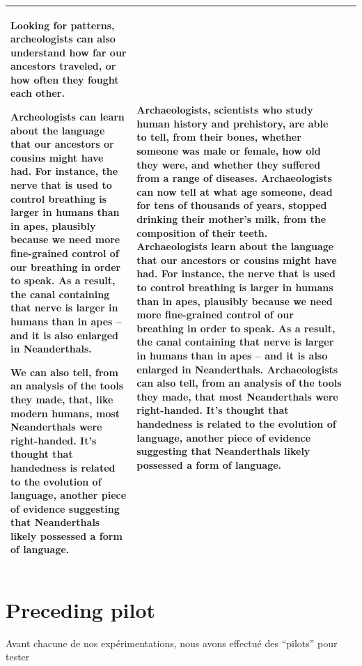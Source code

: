 \documentclass[
  doc,floatsintext]{apa6}
\begin{document}
\begin{longtable}[t]{>{\raggedright\arraybackslash}p{5em}>{\raggedright\arraybackslash}p{20em}>{\raggedright\arraybackslash}p{20em}}
Looking for patterns, archeologists can also understand how far our ancestors traveled, or how often they fought each other.

Archeologists can learn about the language that our ancestors or cousins might have had. For instance, the nerve that is used to control breathing is larger in humans than in apes, plausibly because we need more fine-grained control of our breathing in order to speak. As a result, the canal containing that nerve is larger in humans than in apes – and it is also enlarged in Neanderthals. 

We can also tell, from an analysis of the tools they made, that, like modern humans, most Neanderthals were right-handed. It’s thought that handedness is related to the evolution of language, another piece of evidence suggesting that Neanderthals likely possessed a form of language. & Archaeologists, scientists who study human history and prehistory, are able to tell, from their bones, whether someone was male or female, how old they were, and whether they suffered from a range of diseases. Archaeologists can now tell at what age someone, dead for tens of thousands of years, stopped drinking their mother’s milk, from the composition of their teeth.
Archaeologists learn about the language that our ancestors or cousins might have had. For instance, the nerve that is used to control breathing is larger in humans than in apes, plausibly because we need more fine-grained control of our breathing in order to speak. As a result, the canal containing that nerve is larger in humans than in apes – and it is also enlarged in Neanderthals.
Archaeologists can also tell, from an analysis of the tools they made, that most Neanderthals were right-handed. It’s thought that handedness is related to the evolution of language, another piece of evidence suggesting that Neanderthals likely possessed a form of language.\\
\bottomrule
\end{longtable}

\newpage

\hypertarget{pilot}{%
\section{Preceding pilot}\label{pilot}}

Avant chacune de nos expérimentations, nous avons effectué des ``pilots'' pour tester
\end{document}

